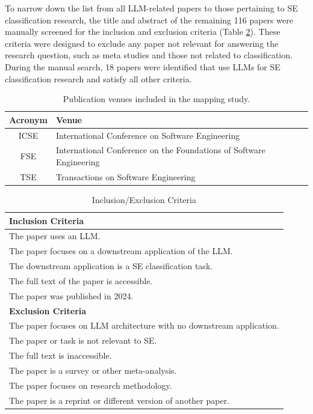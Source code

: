 \documentclass[a4paper]{article}
\begin{document}
To narrow down the list from all LLM-related papers to those pertaining to SE classification research, the title and abstract of the remaining 116 papers were manually screened for the inclusion and exclusion criteria (Table \ref{table:criteria}). These criteria were designed to exclude any paper not relevant for answering the research question, such as meta studies and those not related to classification. During the manual search, 18 papers were identified that use LLMs for SE classification research and satisfy all other criteria. 

\begin{table}[H]
	\raggedright
	\caption{Publication venues included in the mapping study.}
	\begin{tabularx}{\textwidth}{|c|X|} \hline
		\textbf{Acronym} & \textbf{Venue} \\ \hline
		ICSE  & International Conference on Software Engineering \\ \hline
		FSE   & International Conference on the Foundations of Software Engineering \\ \hline
		TSE   & Transactions on Software Engineering \\ \hline
	\end{tabularx}
	\label{table:venues}
\end{table}

\begin{table}[H]
	\caption{Inclusion/Exclusion Criteria}
	\begin{tabularx}{\textwidth}{|X|} \hline
		\textbf{Inclusion Criteria} \\ \hline
		The paper uses an LLM.  \\
		The paper focuses on a downstream application of the LLM. \\
		The downstream application is a SE classification task. \\
		The full text of the paper is accessible. \\
		The paper was published in 2024. \\ \hline
		\textbf{Exclusion Criteria} \\ \hline
		The paper focuses on LLM architecture with no downstream application. \\
		The paper or task is not relevant to SE. \\
		The full text is inaccessible. \\
		The paper is a survey or other meta-analysis. \\
		The paper focuses on research methodology. \\
		The paper is a reprint or different version of another paper. \\ \hline
	\end{tabularx}
	
	\label{table:criteria}
\end{table}
\end{document}
